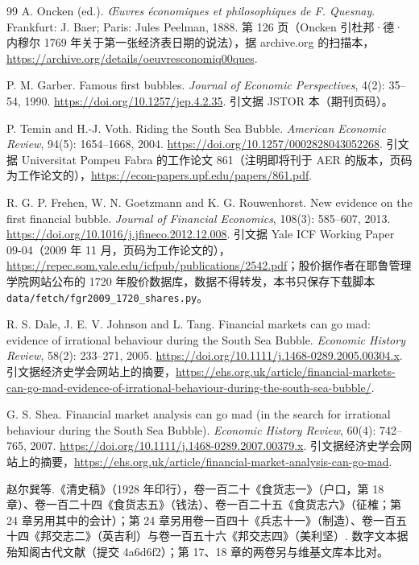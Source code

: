 \begin{thebibliography}{99}
 A. Oncken (ed.). \emph{Œuvres économiques et philosophiques de F. Quesnay}. Frankfurt: J. Baer; Paris: Jules Peelman, 1888. 第 126 页（Oncken 引杜邦·德·内穆尔 1769 年关于第一张经济表日期的说法），据 archive.org 的扫描本，\url{https://archive.org/details/oeuvresconomiq00ques}.

 P. M. Garber. Famous first bubbles. \emph{Journal of Economic Perspectives}, 4(2): 35--54, 1990. \url{https://doi.org/10.1257/jep.4.2.35}. 引文据 JSTOR 本（期刊页码）。

 P. Temin and H.-J. Voth. Riding the South Sea Bubble. \emph{American Economic Review}, 94(5): 1654--1668, 2004. \url{https://doi.org/10.1257/0002828043052268}. 引文据 Universitat Pompeu Fabra 的工作论文 861（注明即将刊于 AER 的版本，页码为工作论文的），\url{https://econ-papers.upf.edu/papers/861.pdf}.

 R. G. P. Frehen, W. N. Goetzmann and K. G. Rouwenhorst. New evidence on the first financial bubble. \emph{Journal of Financial Economics}, 108(3): 585--607, 2013. \url{https://doi.org/10.1016/j.jfineco.2012.12.008}. 引文据 Yale ICF Working Paper 09-04（2009 年 11 月，页码为工作论文的），\url{https://repec.som.yale.edu/icfpub/publications/2542.pdf}；股价据作者在耶鲁管理学院网站公布的 1720 年股价数据库，数据不得转发，本书只保存下载脚本 \texttt{data/fetch/fgr2009\_1720\_shares.py}。

 R. S. Dale, J. E. V. Johnson and L. Tang. Financial markets can go mad: evidence of irrational behaviour during the South Sea Bubble. \emph{Economic History Review}, 58(2): 233--271, 2005. \url{https://doi.org/10.1111/j.1468-0289.2005.00304.x}. 引文据经济史学会网站上的摘要，\url{https://ehs.org.uk/article/financial-markets-can-go-mad-evidence-of-irrational-behaviour-during-the-south-sea-bubble/}.

 G. S. Shea. Financial market analysis can go mad (in the search for irrational behaviour during the South Sea Bubble). \emph{Economic History Review}, 60(4): 742--765, 2007. \url{https://doi.org/10.1111/j.1468-0289.2007.00379.x}. 引文据经济史学会网站上的摘要，\url{https://ehs.org.uk/article/financial-market-analysis-can-go-mad}.

 赵尔巽等.《清史稿》（1928 年印行），卷一百二十《食货志一》（户口，第 18 章）、卷一百二十四《食货志五》（钱法）、卷一百二十五《食货志六》（征榷；第 24 章另用其中的会计）；第 24 章另用卷一百四十《兵志十一》（制造）、卷一百五十四《邦交志二》（英吉利）与卷一百五十六《邦交志四》（美利坚）. 数字文本据殆知阁古代文献（提交 4a6d6f2）；第 17、18 章的两卷另与维基文库本比对。


\end{thebibliography}
